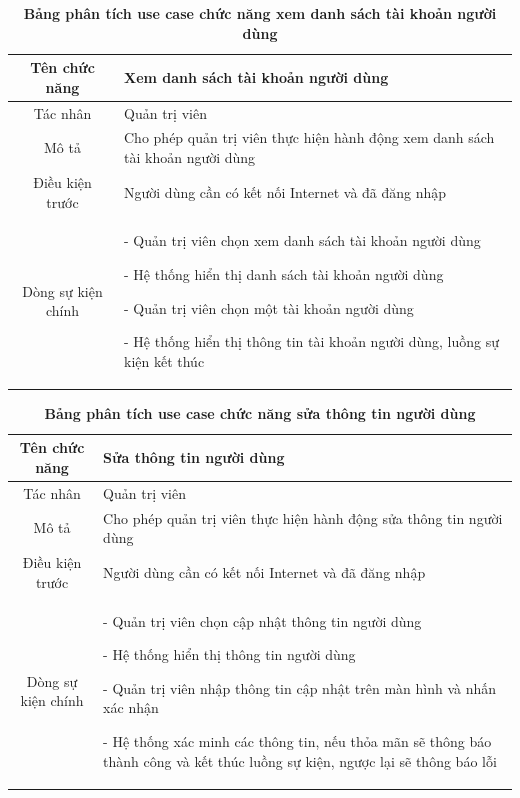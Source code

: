   \begin{table}[H]
    \caption{\bfseries \fontsize{12pt}{0pt}\selectfont Bảng phân tích use case chức năng xem danh sách tài khoản người dùng}
    \centering
    \begin{tabularx}{0.9\textwidth}{|c|X|}
      \hline
      \textbf{Tên chức năng} & \textbf{Xem danh sách tài khoản người dùng} \\
      \hline
      Tác nhân & Quản trị viên \\
      \hline
      Mô tả & Cho phép quản trị viên thực hiện hành động xem danh sách tài khoản người dùng \\
      \hline
      Điều kiện trước & Người dùng cần có kết nối Internet và đã đăng nhập \\
      \hline
      Dòng sự kiện chính & 
        - Quản trị viên chọn xem danh sách tài khoản người dùng
        
        - Hệ thống hiển thị danh sách tài khoản người dùng

        - Quản trị viên chọn một tài khoản người dùng

        - Hệ thống hiển thị thông tin tài khoản người dùng, luồng sự kiện kết thúc         
        \\
      \hline
    \end{tabularx}
  \end{table}

  \begin{table}[H]
    \caption{\bfseries \fontsize{12pt}{0pt}\selectfont Bảng phân tích use case chức năng sửa thông tin người dùng}
    \centering
    \begin{tabularx}{0.9\textwidth}{|c|X|}
      \hline
      \textbf{Tên chức năng} & \textbf{Sửa thông tin người dùng} \\
      \hline
      Tác nhân & Quản trị viên \\
      \hline
      Mô tả & Cho phép quản trị viên thực hiện hành động sửa thông tin người dùng \\
      \hline
      Điều kiện trước & Người dùng cần có kết nối Internet và đã đăng nhập \\
      \hline
      Dòng sự kiện chính & 
        - Quản trị viên chọn cập nhật thông tin người dùng

        - Hệ thống hiển thị thông tin người dùng

        - Quản trị viên nhập thông tin cập nhật trên màn hình và nhấn xác nhận

        - Hệ thống xác minh các thông tin, nếu thỏa mãn sẽ thông báo thành công và kết thúc luồng sự kiện, ngược lại 
        sẽ thông báo lỗi         
        \\
      \hline
    \end{tabularx}
  \end{table}


